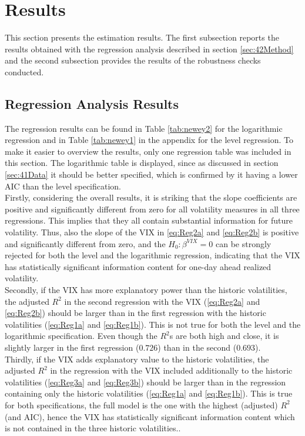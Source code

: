 
\section{Results}\label{sec:5Results}

This section presents the estimation results. The first subsection reports the results obtained with the regression analysis described in section \ref{sec:42Method} and the second subsection provides the results of the robustness checks conducted. 

\subsection{Regression Analysis Results}\label{sec:51Regression}
The regression results can be found in Table \ref{tab:newey2} for the logarithmic regression and in Table \ref{tab:newey1} in the appendix for the level regression. To make it easier to overview the results, only one regression table was included in this section. The logarithmic table is displayed, since as discussed in section \ref{sec:41Data} it should be better specified, which is confirmed by it having a lower AIC than the level specification.\\
Firstly, considering the overall results, it is striking that the slope coefficients are positive and significantly different from zero for all volatility measures in all three regressions. This implies that they all contain substantial information for future volatility. Thus, also the slope of the VIX in \ref{eq:Reg2a} and \ref{eq:Reg2b} is positive and significantly different from zero, and the $H_{0}: \beta^{VIX} = 0$ can be strongly rejected for both the level and the logarithmic regression, indicating that the VIX has statistically significant information content for one-day ahead realized volatility.\\
Secondly, if the VIX has more explanatory power than the historic volatilities, the adjusted $R^{2}$ in the second regression with the \ac{VIX} (\ref{eq:Reg2a} and \ref{eq:Reg2b}) should be larger than in the first regression with the historic volatilities (\ref{eq:Reg1a} and \ref{eq:Reg1b}). This is not true for both the level and the logarithmic specification. Even though the $R^{2}$s are both high and close, it is slightly larger in the first regression ($0.726$) than in the second ($0.693$).\\
Thirdly, if the VIX adds explanatory value to the historic volatilities, the adjusted $R^{2}$ in the regression with the VIX included additionally to the historic volatilities (\ref{eq:Reg3a} and \ref{eq:Reg3b}) should be larger than in the regression containing only the historic volatilities (\ref{eq:Reg1a} and \ref{eq:Reg1b}). This is true for both specifications, the full model is the one with the highest (adjusted) $R^{2}$ (and AIC), hence the VIX has statistically significant information content which is not contained in the three historic volatilities.. \\
